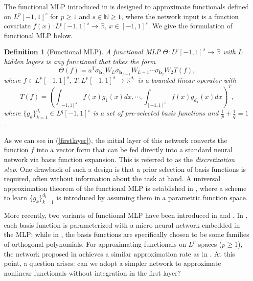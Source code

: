 \documentclass{article}
\def\NN{\mathbb N}
\def\RR{\mathbb R}
\numberwithin{equation}{section}
\newtheorem{definition}[theorem]{Definition}
\begin{document}
The functional MLP introduced in \citep{rossi2005functional} is designed to approximate functionals defined on $L^p[-1,1]^s$ for $p\geq 1$ and $s \in \NN \geq 1$, where the network input is a function covariate $f(x): L^p[-1,1]^s \rightarrow \RR$, $x\in [-1,1]^s$. We give the formulation of functional MLP below. 
\begin{definition}[Functional MLP]
A functional MLP $\Theta:L^p[-1,1]^s \rightarrow \RR$ with $L$ hidden layers is any functional that takes the form
\begin{equation*}
    \Theta(f) = a^T\sigma_{\mathbf b_L}W_L \sigma_{\mathbf b_{L-1}}W_{L-1}\cdots  \sigma_{\mathbf b_2}W_2 T(f),
\end{equation*}
where $f\in L^p[-1,1]^s$, $T:L^p[-1,1]^s \rightarrow \RR^{d_1}$ is a bounded linear operator with 
\begin{equation}\label{firstlayer}
    T(f) = \left(\int_{[-1,1]^s}f(x)g_1(x)dx, \cdots, \int_{[-1,1]^s}f(x)g_{d_1}(x)dx\right)^T,
\end{equation}
where $\{g_k\}_{k=1}^{d_1}\in L^q[-1,1]^s$ is a set of pre-selected basis functions and  $\frac{1}{p}+ \frac{1}{q} = 1$.
\end{definition}
As we can see in (\ref{firstlayer}), 
the initial layer of this network converts the function $f$ into a vector form that can be fed directly into a standard neural network via basis function expansion. 
This is referred to as the \textit{discretization step}. 
One drawback of such a design is that a prior selection of basis functions is required, often without information about the task at hand. 
A universal approximation theorem of the functional MLP is established in \citep{rossi2005functional},
where a scheme to learn $\{g_k\}_{k=1}^{d_1}$ is introduced by assuming them in a parametric function space.

More recently, two variants of functional MLP have been introduced in \citep{yao2021deep} and \citep{song2023approximationarxiv}.
In \citep{yao2021deep}, each basis function is parameterized with a micro neural network embedded in the MLP; 
while in \citep{song2023approximationarxiv}, the basis functions are specifically chosen to be some families of orthogonal polynomials.  
For approximating functionals on $L^p$ spaces ($p\geq 1$), the network proposed in \citep{song2023approximationarxiv} achieves a similar approximation rate as in \citep{mhaskar1997neural}. 
At this point, a question arises: can we adopt a simpler network to approximate nonlinear functionals without integration in the first layer?
\end{document}
